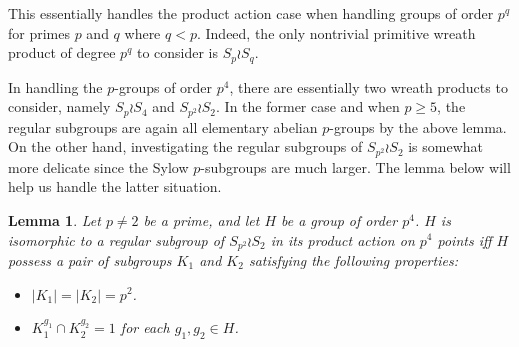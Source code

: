 \documentclass[12pt]{amsart}
\newtheorem{lemma}[theorem]{Lemma}
\theoremstyle{definition}
\begin{document}
This essentially handles the product action case when handling groups of order $p^q$ for primes $p$ and $q$ where $q < p$. Indeed, the only nontrivial primitive wreath product of degree $p^q$ to consider is $S_p \wr S_q$. 

In handling the $p$-groups of order $p^4$, there are essentially two wreath products to consider, namely $S_p \wr S_4$ and $S_{p^2} \wr S_2$. In the former case and when $p \geq 5$, the regular subgroups are again all elementary abelian $p$-groups by the above lemma. On the other hand, investigating the regular subgroups of $S_{p^2} \wr S_2$ is somewhat more delicate since the Sylow $p$-subgroups are much larger. The lemma below will help us handle the latter situation.

\begin{lemma}\label{fund_prod_lem}
	Let $p \neq 2$ be a prime, and let $H$ be a group of order $p^4$. $H$ is isomorphic to a regular subgroup of $S_{p^2} \wr S_{2}$ in its product action on $p^4$ points iff $H$ possess a pair of subgroups $K_1$ and $K_2$ satisfying the following properties:
	\begin{itemize}
		\item[(a)] $|K_1| = |K_2| = p^2$.
		\item[(b)] $K_1^{g_1} \cap K_2^{g_2} = 1$ for each $g_1,g_2 \in H$.
	\end{itemize}  
\end{lemma}
	
\end{document}
